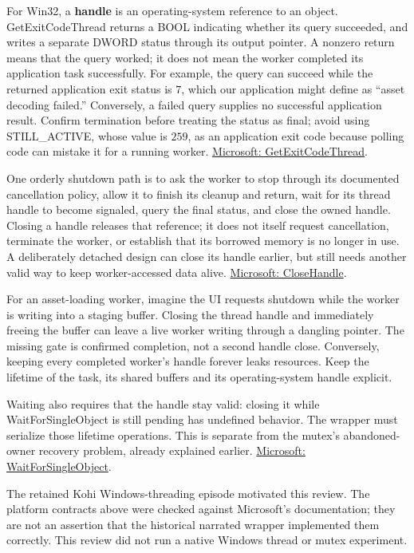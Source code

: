 For Win32, a \textbf{handle} is an operating-system reference to an object. GetExitCodeThread returns a BOOL indicating whether its query succeeded, and writes a separate DWORD status through its output pointer. A nonzero return means that the query worked; it does not mean the worker completed its application task successfully. For example, the query can succeed while the returned application exit status is \(7\), which our application might define as ``asset decoding failed.'' Conversely, a failed query supplies no successful application result. Confirm termination before treating the status as final; avoid using STILL\_ACTIVE, whose value is \(259\), as an application exit code because polling code can mistake it for a running worker. \href{https://learn.microsoft.com/en-us/windows/win32/api/processthreadsapi/nf-processthreadsapi-getexitcodethread}{Microsoft: GetExitCodeThread}.

One orderly shutdown path is to ask the worker to stop through its documented cancellation policy, allow it to finish its cleanup and return, wait for its thread handle to become signaled, query the final status, and close the owned handle. Closing a handle releases that reference; it does not itself request cancellation, terminate the worker, or establish that its borrowed memory is no longer in use. A deliberately detached design can close its handle earlier, but still needs another valid way to keep worker-accessed data alive. \href{https://learn.microsoft.com/en-us/windows/win32/api/handleapi/nf-handleapi-closehandle}{Microsoft: CloseHandle}.

For an asset-loading worker, imagine the UI requests shutdown while the worker is writing into a staging buffer. Closing the thread handle and immediately freeing the buffer can leave a live worker writing through a dangling pointer. The missing gate is confirmed completion, not a second handle close. Conversely, keeping every completed worker's handle forever leaks resources. Keep the lifetime of the task, its shared buffers and its operating-system handle explicit.

Waiting also requires that the handle stay valid: closing it while WaitForSingleObject is still pending has undefined behavior. The wrapper must serialize those lifetime operations. This is separate from the mutex's abandoned-owner recovery problem, already explained earlier. \href{https://learn.microsoft.com/en-us/windows/win32/api/synchapi/nf-synchapi-waitforsingleobject}{Microsoft: WaitForSingleObject}.

The retained Kohi Windows-threading episode motivated this review. The platform contracts above were checked against Microsoft's documentation; they are not an assertion that the historical narrated wrapper implemented them correctly. This review did not run a native Windows thread or mutex experiment.

